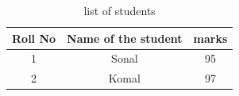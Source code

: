 \begin{table}[htbp]
	\centering
		\begin{tabular}{|c|c|c|}
			\hline Roll No & Name of the student & marks \\
			\hline 1 & Sonal & 95 \\
			\hline 2 & Komal & 97 \\
			\hline
\end{tabular}
\caption{list of students}
\label{tab:listOfStudents}
\end{table}




